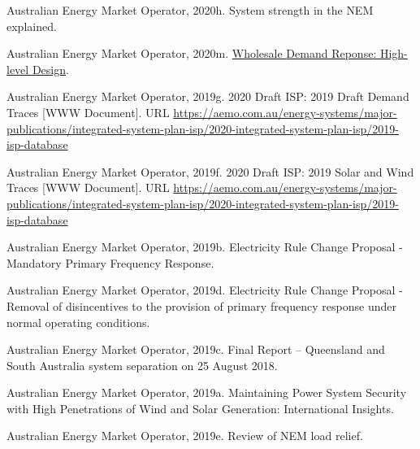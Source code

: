 \documentclass[12pt,a4paper,]{report}
\newlength{\cslhangindent}
\newenvironment{CSLReferences}[2] %
 {%
  \setlength{\parindent}{0pt}
  \ifodd #1 \everypar{\setlength{\hangindent}{\cslhangindent}}\ignorespaces\fi
  \ifnum #2 > 0
  \setlength{\parskip}{#2\baselineskip}
  \fi
 }%
 {}
\begin{document}
\begin{CSLReferences}{1}{0}
\leavevmode{}%
Australian Energy Market Operator, 2020h. System strength in the {NEM}
explained.

\leavevmode{}%
Australian Energy Market Operator, 2020m.
\href{https://www.aemo.com.au/-/media/files/initiatives/submissions/2020/wdrm/wdrm-high-level-design-june-2020.pdf}{Wholesale
{Demand Reponse}: {High-level Design}}.

\leavevmode{}%
Australian Energy Market Operator, 2019g. 2020 {Draft ISP}: 2019 {Draft
Demand Traces} {[}WWW Document{]}. URL
\url{https://aemo.com.au/energy-systems/major-publications/integrated-system-plan-isp/2020-integrated-system-plan-isp/2019-isp-database}

\leavevmode{}%
Australian Energy Market Operator, 2019f. 2020 {Draft ISP}: 2019 {Solar}
and {Wind Traces} {[}WWW Document{]}. URL
\url{https://aemo.com.au/energy-systems/major-publications/integrated-system-plan-isp/2020-integrated-system-plan-isp/2019-isp-database}

\leavevmode{}%
Australian Energy Market Operator, 2019b. Electricity {Rule Change
Proposal} - {Mandatory Primary Frequency Response}.

\leavevmode{}%
Australian Energy Market Operator, 2019d. Electricity {Rule Change
Proposal} - {Removal} of disincentives to the provision of primary
frequency response under normal operating conditions.

\leavevmode{}%
Australian Energy Market Operator, 2019c. Final {Report} -- {Queensland}
and {South Australia} system separation on 25 {August} 2018.

\leavevmode{}%
Australian Energy Market Operator, 2019a. Maintaining {Power System
Security} with {High Penetrations} of {Wind} and {Solar Generation}:
{International Insights}.

\leavevmode{}%
Australian Energy Market Operator, 2019e. Review of {NEM} load relief.


\end{CSLReferences}
\end{document}
